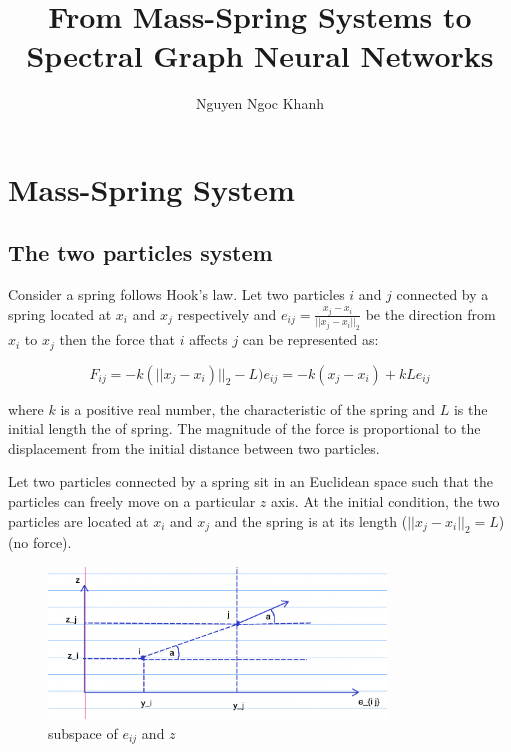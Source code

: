 \documentclass{article}
\title{From Mass-Spring Systems to Spectral Graph Neural Networks}
\author{Nguyen Ngoc Khanh}
\begin{document}
    \maketitle

    \section{Mass-Spring System}

    \subsection{The two particles system}

    Consider a spring follows Hook's law. Let two particles $i$ and $j$ connected by a spring located at $x_i$ and $x_j$ respectively and $e_{i j} = \frac{x_j - x_i}{||x_j - x_i||_2}$ be the direction from $x_i$ to $x_j$ then the force that $i$ affects $j$ can be represented as:

    \begin{equation}
        F_{i j} = - k (||x_j - x_i)||_2 - L) e_{i j} = - k (x_j - x_i) + k L e_{i j}
    \end{equation}

    where $k$ is a positive real number, the characteristic of the spring and $L$ is the initial length the of spring. The magnitude of the force is proportional to the displacement from the initial distance between two particles.

    Let two particles connected by a spring sit in an Euclidean space such that the particles can freely move on a particular $z$ axis. At the initial condition, the two particles are located at $x_i$ and $x_j$ and the spring is at its length ($||x_j - x_i||_2 = L$) (no force).

    \begin{figure}[h!]
        \centering
        \includegraphics[width=0.8\textwidth]{fig1.png}
        \caption{subspace of $e_{i j}$ and $z$}
        \label{fig:fig1}
    \end{figure}
\end{document}
